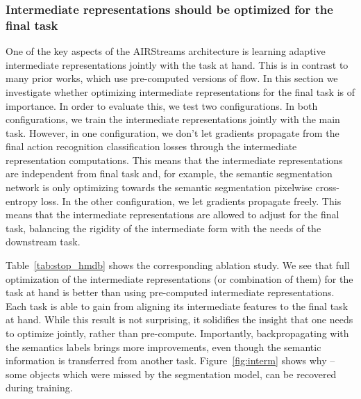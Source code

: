 \documentclass[final]{cvpr}
\begin{document}
\vspace{-0.3cm}
\subsubsection{Intermediate representations should be optimized for the final task}
One of the key aspects of the AIRStreams architecture is learning adaptive intermediate representations jointly with the task at hand. This is in contrast to many prior works, which use pre-computed versions of flow. 
In this section we investigate whether optimizing intermediate representations for the final task is of importance. 
In order to evaluate this, we test two configurations. In both configurations, we train the intermediate representations jointly with the main task. However, in one configuration, we don't let gradients propagate from the final action recognition classification losses through the intermediate representation computations. This means that the intermediate representations are independent from final task and, for example, the semantic segmentation network is only optimizing towards the semantic segmentation pixelwise cross-entropy loss. In the other configuration, we let gradients propagate freely. This means that the intermediate representations are allowed to adjust for the final task, balancing the rigidity of the intermediate form with the needs of the downstream task.

Table~\ref{tab:stop_hmdb} shows the corresponding ablation study. We see that full optimization of the intermediate representations (or combination of them) for the task at hand is better than using pre-computed intermediate representations.
Each task is able to gain from aligning its intermediate features to the final task at hand.
While this result is not surprising, it solidifies the insight that one needs to optimize jointly, rather than pre-compute.
Importantly, backpropagating with the semantics labels brings more improvements, even though the semantic information is transferred from another task. 
Figure~\ref{fig:interm} shows why -- some objects which were missed by the segmentation model, can be recovered during training.  
\end{document}

